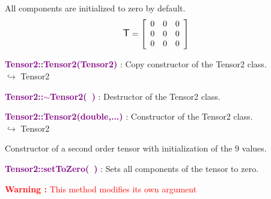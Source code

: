All components are initialized to zero by default.
\begin{equation*}
\mbox{\large\ensuremath{\mathsf{T}}}=\left[\begin{array}{ccc}
0&0&0\\
0&0&0\\
0&0&0
\end{array}\right]
\end{equation*}

\textcolor{purple}{\textbf{Tensor2::Tensor2(Tensor2)}}\label{Tensor2::Tensor2(Tensor2)} : Copy constructor of the Tensor2 class.\\ \hspace*{5mm}$\hookrightarrow$ Tensor2


\textcolor{purple}{\textbf{Tensor2::$\sim$Tensor2(~)}}\label{Tensor2::~Tensor2()} : Destructor of the Tensor2 class.


\textcolor{purple}{\textbf{Tensor2::Tensor2(double,...)}}\label{Tensor2::Tensor2(double,...)} : Constructor of the Tensor2 class.\\ \hspace*{5mm}$\hookrightarrow$ Tensor2

Constructor of a second order tensor with initialization of the 9 values.

\textcolor{purple}{\textbf{Tensor2::setToZero(~)}}\label{Tensor2::setToZero()} : Sets all components of the tensor to zero.

\hspace*{10mm}\textcolor{red}{\textbf{Warning :} This method modifies its own argument}

